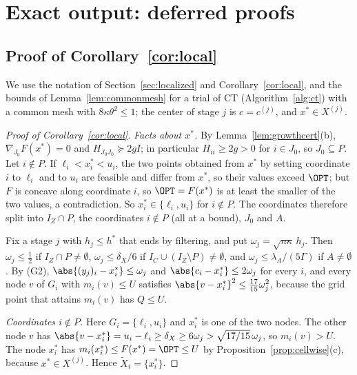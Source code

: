 \section{Exact output: deferred proofs}\label{app:exact}

\subsection{Proof of Corollary~\ref{cor:local}}\label{app:localized}
We use the notation of Section~\ref{sec:localized} and
Corollary~\ref{cor:local}, and the bounds of Lemma~\ref{lem:commonmesh} for a
trial of CT (Algorithm~\ref{alg:ct}) with a common mesh with
$8\kappa\theta^2\le1$; the center of stage $j$ is $c=c^{(j)}$, and
$x^*\in X^{(j)}$.

\begin{proof}[Proof of Corollary~\ref{cor:local}]
\emph{Facts about $x^*$.} By Lemma~\ref{lem:growthcert}(b),
$\nabla_{J_0}F(x^*)=0$ and $H_{J_0J_0}\succeq2gI$; in particular
$H_{ii}\ge2g>0$ for $i\in J_0$, so $J_0\subseteq P$. Let $i\notin P$. If
$\ell_i<x^*_i<u_i$, the two points obtained from $x^*$ by setting coordinate
$i$ to $\ell_i$ and to $u_i$ are feasible and differ from $x^*$, so their
values exceed $\OPT$; but $F$ is
concave along coordinate $i$, so $\OPT=F(x^*)$ is at least the smaller of the
two values, a contradiction. So $x^*_i\in\{\ell_i,u_i\}$ for $i\notin P$. The
coordinates therefore split into $I_Z\cap P$, the coordinates $i\notin P$
(all at a bound), $J_0$ and $A$.

Fix a stage $j$ with $h_j\le h^*$ that ends by filtering, and put
$\omega_j=\sqrt{n\kappa}\,h_j$. Then $\omega_j\le\frac12$ if $I_Z\cap P\ne\emptyset$,
$\omega_j\le\delta_X/6$ if $I_C\cup(I_Z\setminus P)\ne\emptyset$, and
$\omega_j\le\lambda_A/(5\Gamma)$ if $A\ne\emptyset$. By (G2),
$\abs{(y_j)_i-x^*_i}\le\omega_j$ and $\abs{c_i-x^*_i}\le2\omega_j$ for every $i$, and
every node $v$ of $G_i$ with $m_i(v)\le U$ satisfies
$\abs{v-x^*_i}^2\le\frac{17}{15}\omega_j^2$, because the grid point that attains
$m_i(v)$ has $Q\le U$.

\emph{Coordinates $i\notin P$.} Here $G_i=\{\ell_i,u_i\}$ and $x^*_i$ is one
of the two nodes. The other node $v$ has
$\abs{v-x^*_i}=u_i-\ell_i\ge\delta_X\ge6\omega_j>\sqrt{17/15}\,\omega_j$, so
$m_i(v)>U$. The node $x^*_i$ has $m_i(x^*_i)\le F(x^*)=\OPT\le U$ by
Proposition~\ref{prop:cellwise}(c), because $x^*\in X^{(j)}$. Hence
$\tilde X_i=\{x^*_i\}$.


\end{proof}

